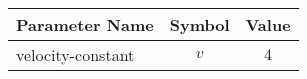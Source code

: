 \begin{tabular}{lcc}
\hline
 Parameter Name    &  Symbol  &  Value  \\
\hline
 velocity-constant &   $v$    &   $4$   \\
\hline
\end{tabular}